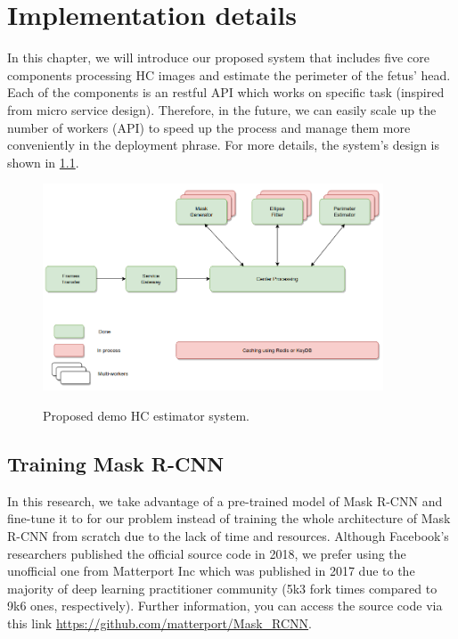 \chapter{Implementation details}
\noindent

	In this chapter, we will introduce our proposed system that includes five core components processing HC images and estimate the perimeter of the fetus' head. Each of the components is an restful API which works on specific task (inspired from micro service design). Therefore, in the future, we can easily scale up the number of workers (API) to speed up the process and manage them more conveniently in the deployment phrase. For more details, the system's design is shown in \ref{fig:hc_system}.
	
	\begin{figure}[H]
		\centering
		{\includegraphics[width=0.9\textwidth]{./hinhanh/chap6/hc_system.png}}
		\caption{Proposed demo HC estimator system.}
		\label{fig:hc_system}
	\end{figure}

\section{Training Mask R-CNN}
\noindent
	
	In this research, we take advantage of a pre-trained model of Mask R-CNN and fine-tune it to for our problem instead of training the whole architecture of Mask R-CNN from scratch due to the lack of time and resources. Although Facebook's researchers published the official source code in 2018, we prefer using the unofficial one from Matterport Inc which was published in 2017 due to the majority of deep learning practitioner community (5k3 fork times compared to 9k6 ones, respectively). Further information, you can access the source code via this link \url{https://github.com/matterport/Mask_RCNN}.
	
